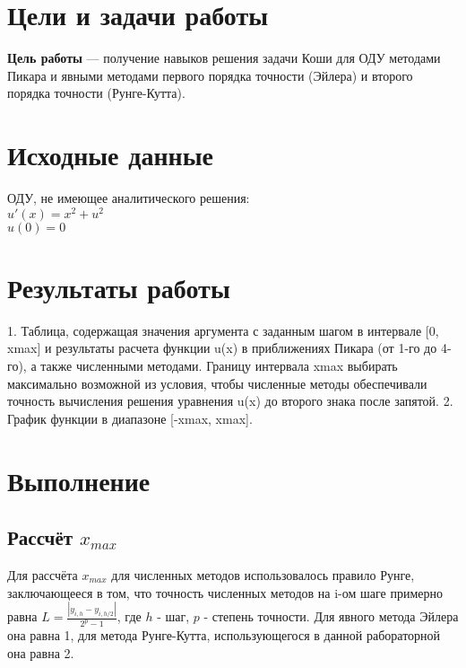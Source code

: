 \chapter{Цели и задачи работы}
\textbf{Цель работы} --- получение навыков решения задачи Коши для ОДУ методами Пикара и
явными методами первого порядка точности (Эйлера) и второго порядка точности (Рунге-Кутта).

\chapter{Исходные данные}
ОДУ, не имеющее аналитического решения:\\
$u'(x) = x^{2} + u^{2}$\\
$u(0) = 0$

\chapter{Результаты работы}
1. Таблица, содержащая значения аргумента с заданным шагом в интервале [0, xmax] и результаты расчета функции u(x) в приближениях Пикара (от 1-го до 4-го), а также численными методами. Границу интервала xmax выбирать максимально возможной из условия, чтобы численные методы обеспечивали точность вычисления решения уравнения u(x) до второго знака после запятой.
2. График функции в диапазоне [-xmax, xmax].

\chapter{Выполнение}
\section{Рассчёт $x_{max}$}
Для рассчёта $x_{max}$ для численных методов использовалось правило Рунге, заключающееся в том, что точность численных методов на i-ом шаге примерно равна $L = \frac{|y_{i, h} - y_{i, h/2}|}{2^{p} - 1}$, где $h$ - шаг, $p$ - степень точности. Для явного метода Эйлера она равна 1, для метода Рунге-Кутта, использующегося в данной рабораторной она равна 2.

